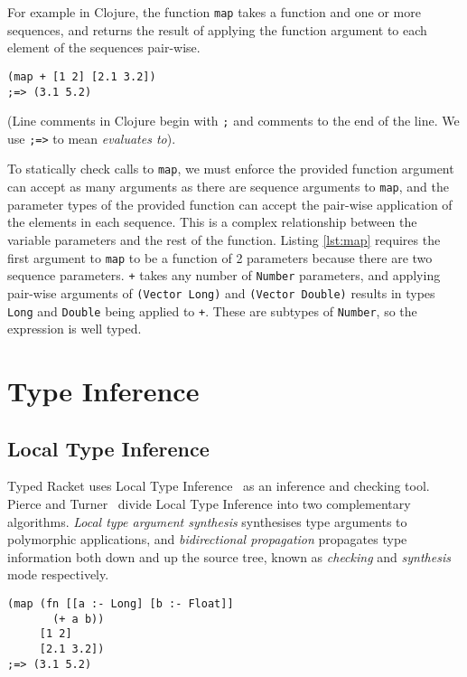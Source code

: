 For example in Clojure, the function \lstinline|map| takes a function and one or more sequences,
and returns the result of applying the function argument to each element of the sequences pair-wise.

\begin{lstlisting}[caption=An application of the non-uniform variable-arity function \lstinline|map|, label=lst:map]
(map + [1 2] [2.1 3.2]) 
;=> (3.1 5.2)
\end{lstlisting}

(Line comments in Clojure begin with \lstinline|;| and comments to the end of the line. We use \lstinline|;=>| to mean \emph{evaluates to}).

To statically check calls to \lstinline|map|, we must enforce the provided function argument can accept as many
arguments as there are sequence arguments to \lstinline|map|, and the parameter types of the provided function can accept
the pair-wise application of the elements in each sequence. This is a complex relationship between the variable parameters and
the rest of the function.
Listing \ref{lst:map} requires the first argument to \lstinline|map| to be a function of 2 parameters because
there are two sequence parameters. \lstinline|+| takes any number of \lstinline|Number| parameters, 
and applying pair-wise arguments of \lstinline|(Vector Long)| and \lstinline|(Vector Double)| 
results in types \lstinline|Long| and \lstinline|Double| being applied to \lstinline|+|. These are subtypes
of \lstinline|Number|, so the expression is well typed.

\section{Type Inference}

\subsection{Local Type Inference}

Typed Racket uses Local Type Inference~\cite{PT00}
as an inference and checking tool. Pierce and Turner~\cite{PT00}
divide Local Type Inference into
two complementary algorithms. \emph{Local type argument synthesis}
synthesises type arguments to polymorphic applications, and \emph{bidirectional
propagation} propagates type information both down and up the source tree,
known as \emph{checking} and \emph{synthesis} mode respectively.

\begin{lstlisting}[caption=Bidirectional checking algorithm with Typed Clojure pseudocode, label=lst:bidir]
(map (fn [[a :- Long] [b :- Float]]
       (+ a b))
     [1 2]
     [2.1 3.2])
;=> (3.1 5.2)
\end{lstlisting}

